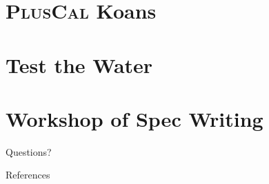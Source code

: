 \documentclass[10pt]{beamer}
\newcommand{\pluscal}{\textbf{\textsc{PlusCal}}\xspace}
\begin{document}
\section{\pluscal Koans}

\section{Test the Water}

\section{Workshop of Spec Writing}


\begin{frame}[standout]
  Questions?
\end{frame}

\appendix

\begin{frame}[allowframebreaks]{References}

  \nocite{*}
  
  

\end{frame}
\end{document}
